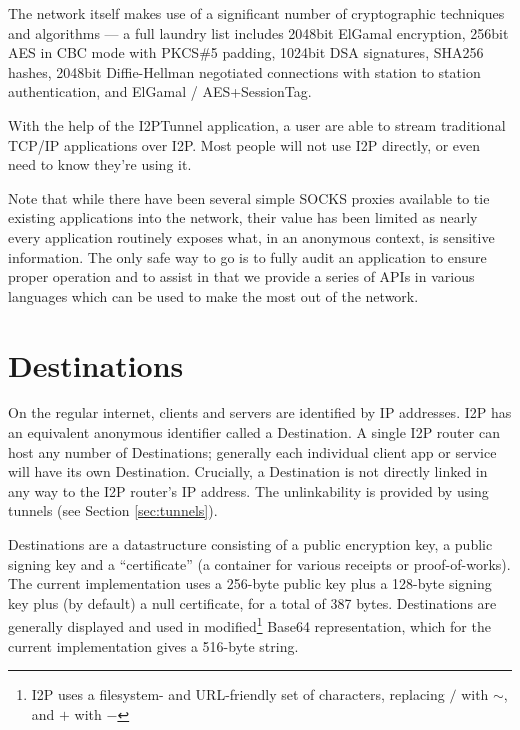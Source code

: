 \documentclass[a4paper,twocolumn,12pt]{article}
\begin{document}
The network itself makes use of a significant number of cryptographic techniques and
algorithms --- a full laundry list includes 2048bit ElGamal\cite{DBLP:journals/tit/Elgamal85}
encryption, 256bit AES\cite{books/sp/DaemenR02} in CBC mode with PKCS\#5 padding, 1024bit 
DSA\cite{2000--dss} signatures, SHA256 hashes, 2048bit Diffie-Hellman negotiated connections with 
station to station authentication, and ElGamal / AES+SessionTag.

\vspace{2 em}

With the help of the I2PTunnel application, a user are able to stream
traditional TCP/IP\cite{rfc793} applications over I2P. Most people will not use I2P
directly, or even need to know they're using it.

Note that while there have been several simple SOCKS proxies available to tie
existing applications into the network, their value has been limited as nearly
every application routinely exposes what, in an anonymous context, is sensitive
information. The only safe way to go is to fully audit an application to ensure
proper operation and to assist in that we provide a series of APIs in various
languages which can be used to make the most out of the network.

\section{Destinations}

On the regular internet, clients and servers are identified by IP addresses\cite{}.
I2P has an equivalent anonymous identifier called a Destination. A single I2P
router can host any number of Destinations; generally each individual client
app or service will have its own Destination. Crucially, a Destination is not
directly linked in any way to the I2P router's IP address. The unlinkability
is provided by using tunnels (see Section \ref{sec:tunnels}).

Destinations are a datastructure consisting of a public encryption key, a
public signing key and a ``certificate'' (a container for various receipts or
proof-of-works). The current implementation uses a 256-byte public key plus a
128-byte signing key plus (by default) a null certificate, for a total of 387
bytes. Destinations are generally displayed and used in modified\footnote{I2P
uses a filesystem- and URL-friendly set of characters, replacing $/$ with
$\sim$, and $+$ with $-$} Base64\cite{rfc4648} representation, which for the
current implementation gives a 516-byte string.
\end{document}
